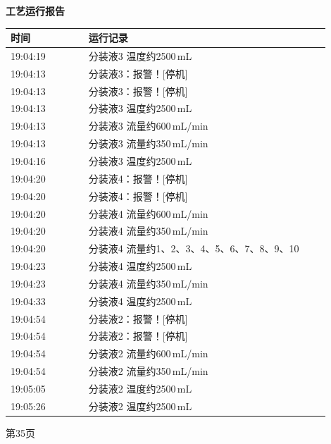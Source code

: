 \documentclass[UTF8,10pt,a4paper,fontset=fandol]{ctexart}
\begin{document}
\noindent
\begin{minipage}[t]{0.47\linewidth}
\centering
\textbf{工艺运行报告}

\vspace{2mm}
\scriptsize
\begin{tabular}{|p{0.22\linewidth}|p{0.68\linewidth}|}
\hline
时间 & 运行记录 \\ \hline
19:04:19 & 分装液3 温度约2500\,mL \\ \hline
19:04:13 & 分装液3：报警！[停机] \\ \hline
19:04:13 & 分装液3：报警！[停机] \\ \hline
19:04:13 & 分装液3 温度约2500\,mL \\ \hline
19:04:13 & 分装液3 流量约600\,mL/min \\ \hline
19:04:13 & 分装液3 流量约350\,mL/min \\ \hline
19:04:16 & 分装液3 温度约2500\,mL \\ \hline
19:04:20 & 分装液4：报警！[停机] \\ \hline
19:04:20 & 分装液4：报警！[停机] \\ \hline
19:04:20 & 分装液4 流量约600\,mL/min \\ \hline
19:04:20 & 分装液4 流量约350\,mL/min \\ \hline
19:04:20 & 分装液4 流量约1、2、3、4、5、6、7、8、9、10 \\ \hline
19:04:23 & 分装液4 温度约2500\,mL \\ \hline
19:04:23 & 分装液4 流量约350\,mL/min \\ \hline
19:04:33 & 分装液4 温度约2500\,mL \\ \hline
19:04:54 & 分装液2：报警！[停机] \\ \hline
19:04:54 & 分装液2：报警！[停机] \\ \hline
19:04:54 & 分装液2 流量约600\,mL/min \\ \hline
19:04:54 & 分装液2 流量约350\,mL/min \\ \hline
19:05:05 & 分装液2 温度约2500\,mL \\ \hline
19:05:26 & 分装液2 温度约2500\,mL \\ \hline
\end{tabular}

\vspace{2mm}
第35页
\end{minipage}
\hfill
\end{document}

